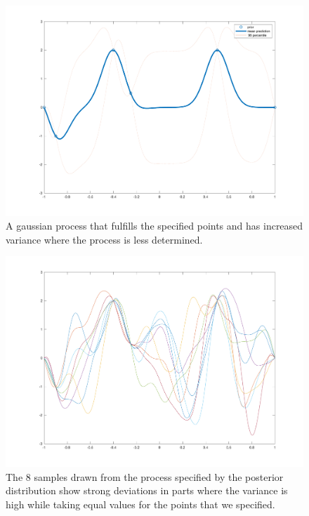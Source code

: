 \documentclass{article}
\begin{document}
\begin{figure}
\centering
\includegraphics[width=.9\linewidth]{fig/mean.pdf}
\caption{A gaussian process that fulfills the specified points and has increased variance where the process is less determined.}
\label{fig:mean}
\end{figure}

\begin{figure}
\centering
\includegraphics[width=.9\linewidth]{fig/8rnd.pdf}
\caption{The 8 samples drawn from the process specified by the posterior distribution show strong deviations in parts where the variance is high while taking equal values for the points that we specified.}
\label{fig:8rnd}
\end{figure}
\end{document}
